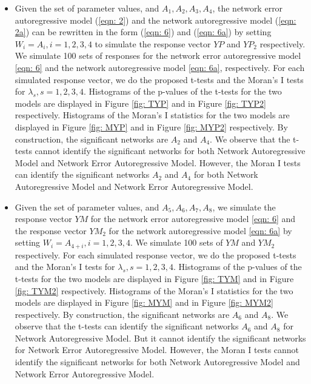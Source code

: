 \documentclass[times, doublespace]{auth}
\begin{document}
\begin{itemize}
	\item Given the set of parameter values, and $A_{1}, A_{2}, A_{3}, A_{4}$, the network error autoregressive model (\ref{eqn: 2}) and the network autoregressive model (\ref{eqn: 2a}) can be rewritten in the form (\ref{eqn: 6}) and (\ref{eqn: 6a}) by setting $W_{i} = A_{i}, i=1,2,3,4$ to simulate the response vector $YP$ and $YP_{2}$ respectively. We simulate 100 sets of responses for the network error autoregressive model \ref{eqn: 6} and the network autoregressive model \ref{eqn: 6a}, respectively. For each simulated response vector, we do the proposed t-tests and the Moran's I tests for $\lambda_{s}, s=1,2,3,4$. Histograms of the p-values of the t-tests for the two models are displayed in Figure \ref{fig: TYP} and in Figure \ref{fig: TYP2} respectively. Histograms of the Moran's I statistics for the two models are displayed in Figure \ref{fig: MYP} and in Figure \ref{fig: MYP2} respectively. By construction, the significant networks are $A_{2}$ and $A_{4}$. We observe that the t-tests cannot identify the significant networks for both Network Autoregressive Model and Network Error Autoregressive Model. However, the Moran I tests can identify the significant networks $A_{2}$ and $A_{4}$ for both Network Autoregressive Model and Network Error Autoregressive Model.
	
	\item Given the set of parameter values, and $A_{5}, A_{6}, A_{7}, A_{8}$, we simulate the response vector $YM$ for the network error autoregressive model \ref{eqn: 6} and the response vector $YM_{2}$ for the network autoregressive model \ref{eqn: 6a} by setting $W_{i} = A_{4+i}, i=1,2,3,4$. We simulate 100 sets of $YM$ and $YM_{2}$ respectively. For each simulated response vector, we do the proposed t-tests and the Moran's I tests for $\lambda_{s}, s=1,2,3,4$. Histograms of the p-values of the t-tests for the two models are displayed in Figure \ref{fig: TYM} and in Figure \ref{fig: TYM2} respectively. Histograms of the Moran's I statistics for the two models are displayed in Figure \ref{fig: MYM} and in Figure \ref{fig: MYM2} respectively. By construction, the significant networks are $A_{6}$ and $A_{8}$. We observe that the t-tests can identify the significant networks $A_{6}$ and $A_{8}$ for Network Autoregressive Model. But it cannot identify the significant networks for Network Error Autoregressive Model. However, the Moran I tests cannot identify the significant networks for both Network Autoregressive Model and Network Error Autoregressive Model.
	

\end{itemize}
\end{document}
